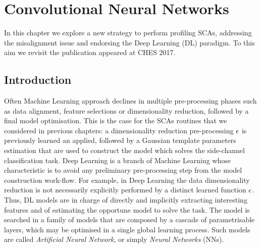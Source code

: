 
\chapter{Convolutional Neural Networks} %
\label{ChapterCNN}


In this chapter we explore a new strategy to perform profiling SCAs, addressing the misalignment issue and endorsing the Deep Learning (DL) paradigm. To this aim we revisit the publication \cite{DBLP:conf/ches/CagliDP17} appeared at CHES 2017.\\

\section{Introduction}
Often Machine Learning approach declines in multiple pre-processing phases such as data alignment, feature selections or dimensionality reduction, followed by a final model optimisation. This is the case for the SCAs routines that we considered in previous chapters: a dimensionality reduction pre-processing $\epsilon$ is previously learned an applied, followed by a Gaussian template parameters estimation that are used to construct the model which solves the side-channel classification task.  Deep Learning is a branch of Machine Learning whose characteristic is to avoid any preliminary pre-processing step from the model construction work-flow. For example, in Deep Learning the data dimensionality reduction is not necessarily explicitly performed by a distinct learned  function $\epsilon$. Thus, DL models are in charge of directly and implicitly extracting interesting features and of estimating the opportune model to solve the task. The model is searched in a family of models that are composed by a cascade of parametrisable layers, which may be optimised in a single global learning process. Such models are called \emph{Artificial Neural Network}, or simply \emph{Neural Networks} (NNs). \\

